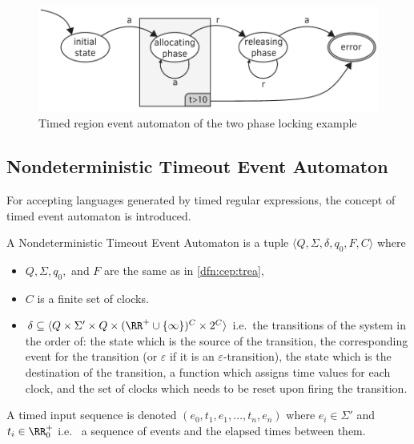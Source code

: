 			\begin{figure}[h]
				\centering
				\includegraphics[width=0.7\linewidth]{figures/chapter_4/allocating_timed}
				\caption{Timed region event automaton of the two phase locking example \redraw}
				\label{fig:cep:trea}
			\end{figure}
			
			\subsection{Nondeterministic Timeout Event Automaton}
			
				For accepting languages generated by timed regular expressions, the concept of timed event automaton is introduced.	
				
				\begin{dfn}
					\label{dfn:cep:tea}
					A Nondeterministic Timeout Event Automaton is a tuple $\langle Q,\Sigma,\delta,q_0, F, C \rangle$ where
					\begin{itemize}
						\item $Q, \Sigma, q_0,$ and $F$ are the same as in \cref{dfn:cep:trea},	
						\item $C$ is a finite set of clocks.
						\item $\delta \subseteq \langle Q \times \Sigma' \times Q \times (\RR^+ \cup \{\infty\})^C \times 2^C \rangle$ i.e.~the transitions of the system in the order of:
							the state which is the source of the transition,
							the corresponding event for the transition (or $\varepsilon$ if it is an $\varepsilon$-transition),
							the state which is the destination of the transition,
							a function which assigns time values for each clock,
							and the set of clocks which needs to be reset upon firing the transition.
					\end{itemize}
				\end{dfn}
			
				\begin{dfn}
					\label{dfn:cep:tea:inputseq}
					A timed input sequence is denoted $(e_0, t_1, e_1, \dots, t_n, e_n)$ where $e_i \in \Sigma'$ and $t_i \in \RR^+_0$ i.e.~ a sequence of events and the elapsed times between them.
				\end{dfn}
			
